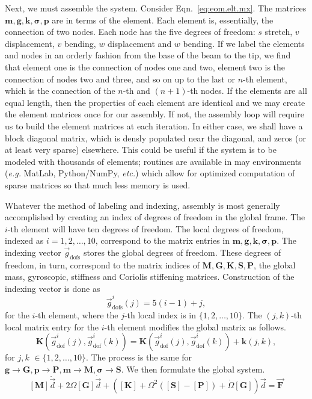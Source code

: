 Next, we must assemble the system. Consider Eqn.~\ref{eq:eom.elt.mx}. The matrices $\mathbf{m},\mathbf{g},\mathbf{k},\mathbf{\sigma},\mathbf{p}$ are in terms of the element. Each element is, essentially, the connection of two nodes. Each node has the five degrees of freedom: $s$ stretch, $v$ displacement, $v$ bending, $w$ displacement and $w$ bending. If we label the elements and nodes in an orderly fashion from the base of the beam to the tip, we find that element one is the connection of nodes one and two, element two is the connection of nodes two and three, and so on up to the last or $n$-th element, which is the connection of the $n$-th and $(n+1)$-th nodes. If the elements are all equal length, then the properties of each element are identical and we may create the element matrices once for our assembly. If not, the assembly loop will require us to build the element matrices at each iteration. In either case, we shall have a block diagonal matrix, which is densly populated near the diagonal, and zeros (or at least very sparse) elsewhere. This could be useful if the system is to be modeled with thousands of elements; routines are available in may environments (\emph{e.g.} MatLab, Python/NumPy, \emph{etc.}) which allow for optimized computation of sparse matrices so that much less memory is used.

Whatever the method of labeling and indexing, assembly is most generally accomplished by creating an index of degrees of freedom in the global frame. The $i$-th element will have ten degrees of freedom. The local degrees of freedom, indexed as $i=1,2,\dots,10$, correspond to the matrix entries in $\mathbf{m},\mathbf{g},\mathbf{k},\mathbf{\sigma},\mathbf{p}$. The indexing vector $\vec g_{\text{dofs}}$ stores the global degrees of freedom. These degrees of freedom, in turn, correspond to the matrix indices of $\mathbf{M},\mathbf{G},\mathbf{K},\mathbf{S},\mathbf{P}$, the global mass, gyroscopic, stiffness and Coriolis stiffening matrices. Construction of the indexing vector is done as
\begin{equation}
\vec g_{\text{dofs}}^i(j) = 5(i-1)+j,
\end{equation}
for the $i$-th element, where the $j$-th local index is in $\lbrace1,2,\dots,10\rbrace$. The $(j,k)$-th local matrix entry for the $i$-th element modifies the global matrix as follows.
\begin{equation}
\mathbf{K}(\vec{g}_{\text{dof}}^i(j),\vec{g}_{\text{dof}}^i(k)) = \mathbf{K}(\vec{g}_{\text{dof}}^i(j),\vec{g}_{\text{dof}}^i(k))+\mathbf{k}(j,k),
\end{equation}
for $j,k$ $\in\lbrace1,2,\dots,10\rbrace$. The process is the same for $\textbf{g}\rightarrow\textbf{G},\mathbf{p}\rightarrow\mathbf{P},\mathbf{m}\rightarrow\mathbf{M},\mathbf{\sigma}\rightarrow\mathbf{S}$. We then formulate the global system.
\begin{equation}
\mathbf{[M]}\ddot{\vec d} +2\Omega\mathbf{[G]}\dot{\vec d} + (\mathbf{[K]}+\Omega^2(\mathbf{[S]}-\mathbf{[P]})+\dot\Omega\mathbf{[G]} )\vec d = \vec{\mathbf{F}}
\end{equation}

